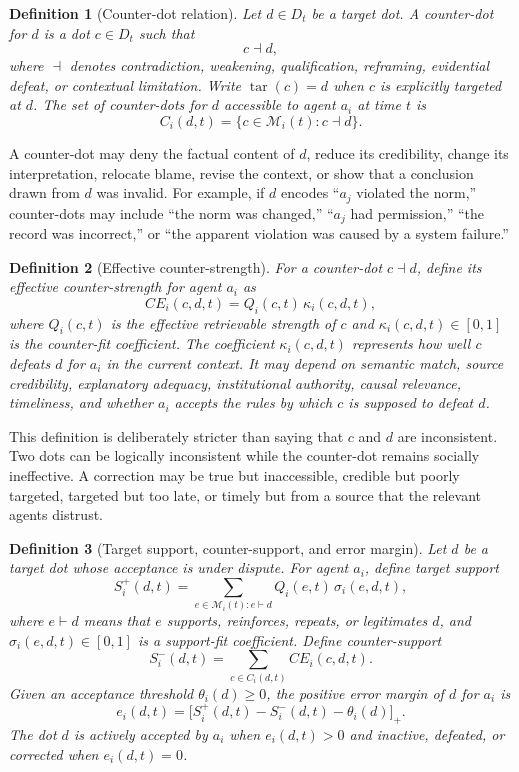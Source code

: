 \documentclass[11pt]{article}
\newtheorem{definition}{Definition}
\theoremstyle{remark}
\begin{document}
\begin{definition}[Counter-dot relation]\label{def:counter-dot-relation}
Let $d\in D_t$ be a target dot. A counter-dot for $d$ is a dot
$c\in D_t$ such that
$$
c\dashv d,
$$
where $\dashv$ denotes contradiction, weakening, qualification,
reframing, evidential defeat, or contextual limitation. Write
$\operatorname{tar}(c)=d$ when $c$ is explicitly targeted at $d$. The
set of counter-dots for $d$ accessible to agent $a_i$ at time $t$ is
$$
C_i(d,t)=\{c\in \mathcal M_i(t):c\dashv d\}.
$$
\end{definition}

A counter-dot may deny the factual content of $d$, reduce its
credibility, change its interpretation, relocate blame, revise the
context, or show that a conclusion drawn from $d$ was invalid. For
example, if $d$ encodes ``$a_j$ violated the norm,'' counter-dots may
include ``the norm was changed,'' ``$a_j$ had permission,'' ``the record
was incorrect,'' or ``the apparent violation was caused by a system
failure.''

\begin{definition}[Effective counter-strength]\label{def:effective-counter-strength}
For a counter-dot $c\dashv d$, define its effective counter-strength for
agent $a_i$ as
$$
CE_i(c,d,t)=Q_i(c,t)\,\kappa_i(c,d,t),
$$
where $Q_i(c,t)$ is the effective retrievable strength of $c$ and
$\kappa_i(c,d,t)\in[0,1]$ is the counter-fit coefficient. The coefficient
$\kappa_i(c,d,t)$ represents how well $c$ defeats $d$ for $a_i$ in the
current context. It may depend on semantic match, source credibility,
explanatory adequacy, institutional authority, causal relevance,
timeliness, and whether $a_i$ accepts the rules by which $c$ is supposed
to defeat $d$.
\end{definition}

This definition is deliberately stricter than saying that $c$ and $d$
are inconsistent. Two dots can be logically inconsistent while the
counter-dot remains socially ineffective. A correction may be true but
inaccessible, credible but poorly targeted, targeted but too late, or
timely but from a source that the relevant agents distrust.

\begin{definition}[Target support, counter-support, and error margin]\label{def:error-margin}
Let $d$ be a target dot whose acceptance is under dispute. For agent
$a_i$, define target support
$$
S_i^+(d,t)=\sum_{e\in \mathcal M_i(t):e\vdash d}Q_i(e,t)\,\sigma_i(e,d,t),
$$
where $e\vdash d$ means that $e$ supports, reinforces, repeats, or
legitimates $d$, and $\sigma_i(e,d,t)\in[0,1]$ is a support-fit
coefficient. Define counter-support
$$
S_i^-(d,t)=\sum_{c\in C_i(d,t)}CE_i(c,d,t).
$$
Given an acceptance threshold $\theta_i(d)\geq0$, the positive error
margin of $d$ for $a_i$ is
$$
e_i(d,t)=\big[S_i^+(d,t)-S_i^-(d,t)-\theta_i(d)\big]_+.
$$
The dot $d$ is actively accepted by $a_i$ when $e_i(d,t)>0$ and inactive,
defeated, or corrected when $e_i(d,t)=0$.
\end{definition}
\end{document}
